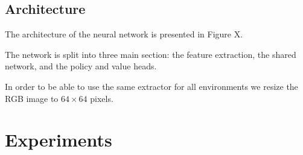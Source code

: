


\subsection{Architecture}



The architecture of the neural network is presented in Figure X.

The network is split into three main section: the feature extraction, the shared network, and the policy and value heads.

In order to be able to use the same extractor for all environments we resize the RGB image to \(64 \times 64\) pixels.





\section{Experiments}
\label{sec:experiments}

